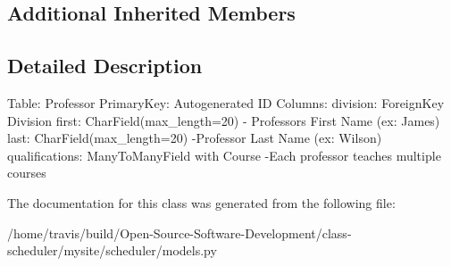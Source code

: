 \subsection*{Additional Inherited Members}


\subsection{Detailed Description}
\begin{DoxyVerb}    Table: Professor
    PrimaryKey: Autogenerated ID
    Columns:
        division: ForeignKey Division
        first: CharField(max_length=20)
            - Professors First Name (ex: James)
        last: CharField(max_length=20)
            -Professor Last Name (ex: Wilson)
        qualifications: ManyToManyField with Course
            -Each professor teaches multiple courses 
\end{DoxyVerb}
 

The documentation for this class was generated from the following file\-:\begin{DoxyCompactItemize}
\item 
/home/travis/build/\-Open-\/\-Source-\/\-Software-\/\-Development/class-\/scheduler/mysite/scheduler/models.\-py\end{DoxyCompactItemize}
